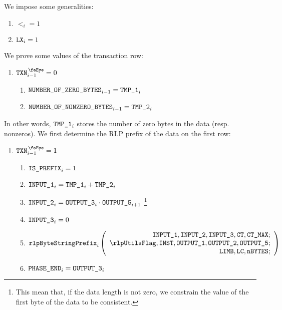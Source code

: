 \begin{center}
\end{center}
We impose some generalities:
\begin{enumerate}
	\item $\lt_{i}=1$
	\item $\texttt{LX}_{i}=1$
\end{enumerate}
We prove some values of the transaction row:
\begin{enumerate}[resume]
	\item \If $\isTxn_{i-1}=0$ \Then
		\begin{enumerate}
			\item $\texttt{NUMBER\_OF\_ZERO\_BYTES}_{i-1}    = \texttt{TMP\_1}_{i}$
			\item $\texttt{NUMBER\_OF\_NONZERO\_BYTES}_{i-1} = \texttt{TMP\_2}_{i}$
		\end{enumerate}
\end{enumerate}
In other words, $\texttt{TMP\_1}_{i}$ stores the number of zero bytes in the data (resp. nonzeros). 
\newline
We first determine the RLP prefix of the data on the first row:
\begin{enumerate}[resume]
	\item \If $\isTxn_{i-1}=1$ \Then
		\begin{enumerate}
			\item $\texttt{IS\_PREFIX}_{i} = 1$
			\item $\texttt{INPUT\_1}_{i} = \texttt{TMP\_1}_{i} + \texttt{TMP\_2}_{i}$
			\item $\texttt{INPUT\_2}_{i} = \texttt{OUTPUT\_3}_{i} \cdot \texttt{OUTPUT\_5}_{i+1}$
				\footnote{This mean that, if the data length is not zero, we constrain the value of the first byte of the data to be consistent.}
			\item $\texttt{INPUT\_3}_{i} = 0$ 
			\item 
				\[
					\rlpBytestringPrefix_{i}
					\left(
					\begin{array}{r}
						\inputColumn{1},
						\inputColumn{2},
						\inputColumn{3},
						\ct,
						\maxCt; \\
						\rlpUtilsFlag,
						\INST,
						\outputColumn{1},
						\outputColumn{2},
						\outputColumn{5}; \\
						\limb,
						\lc,
						\limbsize; \\
					\end{array}
					\right)
				\]
			\item $\texttt{PHASE\_END}_{i} = \texttt{OUTPUT\_3}_{i}$
		\end{enumerate}
\end{enumerate}
